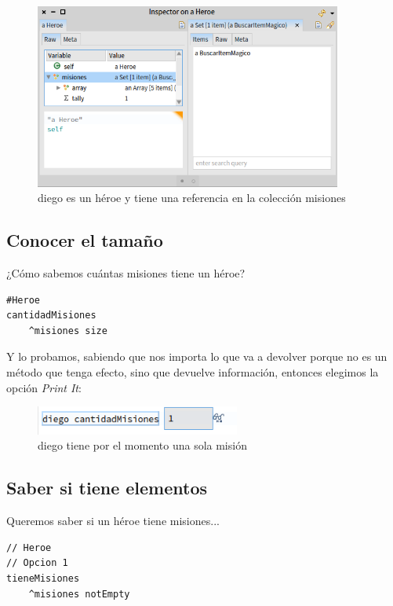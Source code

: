 \documentclass[a4paper,12pt]{book}
\begin{document}
\begin{figure}[h!]
    \centering	
    \includegraphics[width=0.9\textwidth]{images/14_coleccion_inicial.png}
    \caption{diego es un héroe y tiene una referencia en la colección misiones}
\end{figure}
\FloatBarrier


\subsection{Conocer el tamaño}
¿Cómo sabemos cuántas misiones tiene un héroe?

\begin{lstlisting}[frame=single]
#Heroe
cantidadMisiones
    ^misiones size
\end{lstlisting}
Y lo probamos, sabiendo que nos importa lo que va a devolver porque no es un método que tenga efecto, sino que
devuelve información, entonces elegimos la opción \textit{Print It}:

\begin{figure}[h!]
    \centering	
    \includegraphics[width=0.6\textwidth]{images/15_diego_cantidadMisiones.png}
    \caption{diego tiene por el momento una sola misión}
\end{figure}
\FloatBarrier

\subsection{Saber si tiene elementos}
Queremos saber si un héroe tiene misiones...

\begin{lstlisting}[frame=single]
// Heroe
// Opcion 1
tieneMisiones
    ^misiones notEmpty
\end{lstlisting}
\end{document}
